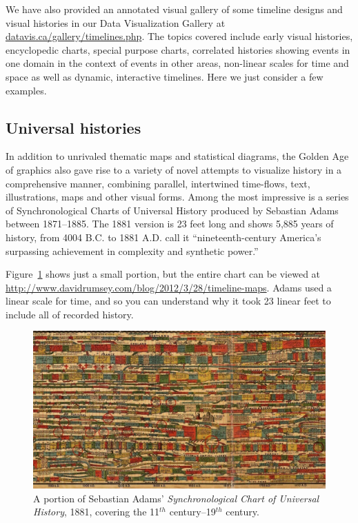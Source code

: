 \documentclass[11pt]{article}
\newcommand*{\figref}[1]{Figure~\ref{#1}}
\newcommand{\Cent}[1]{#1$^{th}$ century}
\begin{document}
We have also provided an annotated visual gallery of some timeline designs and visual histories
in our Data Visualization Gallery at \url{datavis.ca/gallery/timelines.php}. The topics covered
include early visual histories, encyclopedic charts, special purpose charts, correlated histories
showing events in one domain in the context of events in other areas, non-linear scales for
time and space as well as dynamic, interactive timelines.  Here we just consider a few examples.

\subsection{Universal histories}
In addition to unrivaled thematic maps and statistical diagrams, the Golden Age of graphics also
gave rise to a variety of novel attempts to visualize history in a comprehensive manner,
combining parallel, intertwined time-flows, text, illustrations, maps and other visual forms.
Among the most impressive is a series of Synchronological Charts of Universal History
produced by Sebastian Adams between 1871--1885.
The 1881 version is 23 feet long and shows 5,885 years of history, from 4004 B.C. to 1881 A.D.
\citet[p. 172]{RosenbergGrafton:2010} call it ``nineteenth-century America's surpassing achievement in complexity and synthetic power.'' 

\figref{fig:Adams1881} shows just a small portion, but the entire chart can be viewed at
\url{http://www.davidrumsey.com/blog/2012/3/28/timeline-maps}.  Adams used a linear scale for
time, and so you can understand why it took 23 linear feet to include all of recorded history.

\begin{figure}[!htb]
  \centering
  \includegraphics[width=\textwidth,clip]{fig/Adams1881-4}
  \caption{A portion of Sebastian Adams' \emph{Synchronological Chart of Universal History}, 1881,
  covering the \Cent{11}--\Cent{19}.
  }
  \label{fig:Adams1881}
\end{figure}
\end{document}
